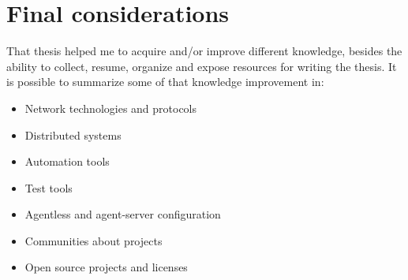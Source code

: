 \documentclass[12pt,a4paper,openright,twoside]{book}
\begin{document}
\section{Final considerations}
That thesis helped me to acquire and/or improve different knowledge, besides the ability to collect, resume, organize and expose resources for writing the thesis.
It is possible to summarize some of that knowledge improvement in:

\begin{itemize}
    \item Network technologies and protocols
    \item Distributed systems
    \item Automation tools
    \item Test tools
    \item Agentless and agent-server configuration
    \item Communities about projects
    \item Open source projects and licenses
\end{itemize}


\backmatter

\nocite{*} %



\end{document}
